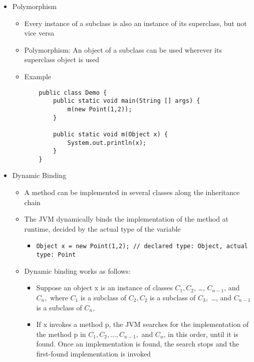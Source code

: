 \begin{itemize}
	\item Polymorphism
	\begin{itemize}
		\item Every instance of a subclass is also an instance of its superclass, but not vice versa
		\item Polymorphism: An object of a subclass can be used wherever its superclass object is used
		\item Example\\
		\begin{minipage}{0.3\textwidth}
			\centering
			\begin{Verbatim}
	public class Demo {
		public static void main(String [] args) {
			m(new Point(1,2));
		}

		public static void m(Object x) {
			System.out.println(x);
		}
	}
			\end{Verbatim}
		\end{minipage}
	\end{itemize}

	\item Dynamic Binding
	\begin{itemize}
		\item A method can be implemented in several classes along the inheritance chain
		\item The JVM dynamically binds the implementation of the method at runtime, decided by the actual type of the variable
		\begin{itemize}
			\item \Verb|Object x = new Point(1,2); // declared type: Object, actual type: Point|
		\end{itemize}
		\item Dynamic binding works as follows:
		\begin{itemize}
			\item Suppose an object x is an instance of classes $ C_1, C_2 $, \ldots , $ C_{n-1} $, and $ C_n, $ where $ C_1 $ is a subclass of $ C_2, C_2 $ is a subclass of $ C_3, $ \ldots , and $ C_{n-1} $ is a subclass of $ C_n, $
			\item If x invokes a method p, the JVM searches for the implementation of the method p in $ C_1, C_2, \ldots , C_{n-1}, $ and $ C_n $, in this order, until it is found. Once an implementation is found, the search stops and the first-found implementation is invoked
		\end{itemize}
	\end{itemize}


\end{itemize}
